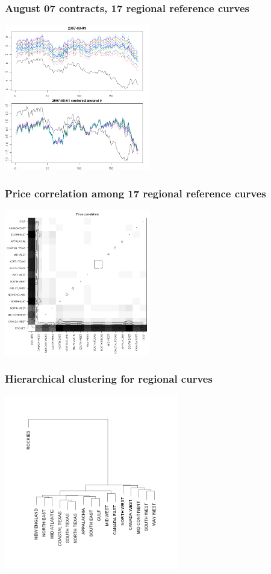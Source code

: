 \documentclass[10pt]{beamer}
\begin{document}
\frame
{
\frametitle{August 07 contracts, 17 regional reference curves}
\begin{center}
  \includegraphics[height=2.5in]{figures/regional-0708-01.png}
\end{center}
}

\frame
{
\frametitle{Price correlation among 17 regional reference curves}
\begin{center}
  \includegraphics[height=2.5in]{figures/regional-0708-02.png}
\end{center}
}


\frame
{
\frametitle{Hierarchical clustering for  regional curves}
\begin{center}
  \includegraphics[height=3.0in]{figures/regional-0708-04.png}
\end{center}
}
\end{document}
